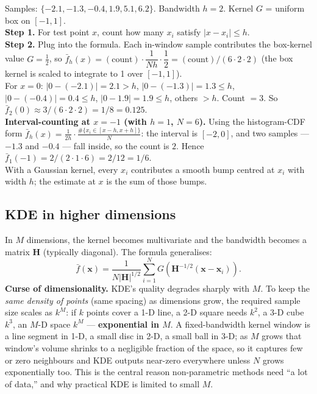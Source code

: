 \documentclass[11pt, a4paper]{article}
\begin{document}
\begin{exbox}
Samples: $\{-2.1, -1.3, -0.4, 1.9, 5.1, 6.2\}$. Bandwidth $h = 2$. Kernel $G$ = uniform box on $[-1, 1]$.\\[0.3em]
\textbf{Step 1.} For test point $x$, count how many $x_i$ satisfy $|x - x_i| \le h$.\\
\textbf{Step 2.} Plug into the formula. Each in-window sample contributes the box-kernel value $G = \tfrac{1}{2}$, so $\bar f_h(x) = (\text{count})\cdot\dfrac{1}{Nh}\cdot\dfrac{1}{2} = (\text{count})/(6\cdot 2\cdot 2)$ (the box kernel is scaled to integrate to 1 over $[-1,1]$).\\[0.3em]
For $x = 0$: $|0 - (-2.1)| = 2.1 > h$, $|0-(-1.3)| = 1.3 \le h$, $|0-(-0.4)| = 0.4 \le h$, $|0-1.9| = 1.9 \le h$, others $> h$. Count $= 3$. So $\bar f_2(0) \approx 3/(6\cdot 2 \cdot 2) = 1/8 = 0.125$.\\[0.3em]
\textbf{Interval-counting at $x = -1$ (with $h = 1$, $N = 6$).} Using the histogram-CDF form $\bar f_h(x) = \frac{1}{2h}\cdot\frac{\#\{x_i\in[x-h,x+h]\}}{N}$: the interval is $[-2, 0]$, and two samples — $-1.3$ and $-0.4$ — fall inside, so the count is $2$. Hence $\bar f_1(-1) = 2/(2\cdot 1\cdot 6) = 2/12 = 1/6$.\\[0.3em]
With a Gaussian kernel, every $x_i$ contributes a smooth bump centred at $x_i$ with width $h$; the estimate at $x$ is the sum of those bumps.
\end{exbox}

\subsection{KDE in higher dimensions}

In $M$ dimensions, the kernel becomes multivariate and the bandwidth becomes a matrix $\mathbf{H}$ (typically diagonal). The formula generalises:
\[
\bar f(\mathbf{x}) = \frac{1}{N|\mathbf{H}|^{1/2}}\sum_{i=1}^N G\!\left(\mathbf{H}^{-1/2}(\mathbf{x}-\mathbf{x}_i)\right).
\]
\textbf{Curse of dimensionality.} KDE's quality degrades sharply with $M$. To keep the \emph{same density of points} (same spacing) as dimensions grow, the required sample size scales as $k^M$: if $k$ points cover a 1-D line, a 2-D square needs $k^2$, a 3-D cube $k^3$, an $M$-D space $k^M$ --- \textbf{exponential in $M$}. A fixed-bandwidth kernel window is a line segment in 1-D, a small disc in 2-D, a small ball in 3-D; as $M$ grows that window's volume shrinks to a negligible fraction of the space, so it captures few or zero neighbours and KDE outputs near-zero everywhere unless $N$ grows exponentially too. This is the central reason non-parametric methods need ``a lot of data,'' and why practical KDE is limited to small $M$.
\end{document}
